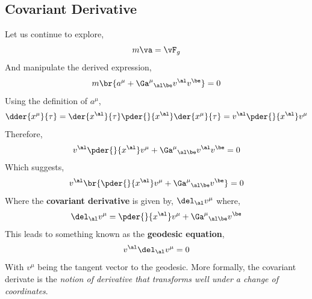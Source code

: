 \documentclass{article}
\begin{document}
\subsection{Covariant Derivative}
Let us continue to explore,
\[ m \va = \vF_g \]
And manipulate the derived expression,
\[ m \br{a^\mu + {\Ga^\mu}_{\al\be}v^\al v^\be} = 0 \]
Using the definition of $a^\mu$,
\[ \dder{x^\mu}{\tau} = \der{x^\al}{\tau} \pder{}{x^\al} \der{x^\mu}{\tau} = v^\al \pder{}{x^\al} v^\mu \]
Therefore,
\[ v^\al \pder{}{x^\al} v^\mu + {\Ga^\mu}_{\al\be}v^\al v^\be = 0\]
Which suggests,
\[ v^\al \br{\pder{}{x^\al} v^\mu + {\Ga^\mu}_{\al\be} v^\be} = 0 \]
Where the \textbf{covariant derivative} is given by, $\del_\al v^\mu$ where,
\[ \del_\al v^\mu = \pder{}{x^\al} v^\mu + {\Ga^\mu}_{\al\be} v^\be \]
This leads to something known as the \textbf{geodesic equation},
\[ v^\al \del_\al v^\mu = 0 \]
With $v^\mu$ being the tangent vector to the geodesic. More formally, the covariant derivate is the \textit{notion of derivative that transforms well under a change of coordinates}.\\
\end{document}

